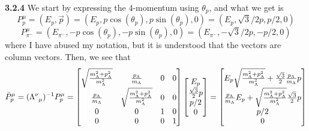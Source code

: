 \documentclass[10pt]{article}
\begin{document}
\textbf{3.2.4} We start by expressing the 4-momentum using $\theta_{p}$, and what we get is
\[ P_{p}^{\mu} = (E_{p}, \vec{p}) = (E_{p}, p\cos(\theta_{p}), p\sin(\theta_{p}), 0) = (E_{p}, \sqrt{3}/2 p, p/2, 0)\]
\[ P_{\pi^{-}}^{\mu} = (E_{\pi^{-}}, -p\cos(\theta_{p}), -p\sin(\theta_{p}), 0) = (E_{\pi^{-}}, -\sqrt{3}/2 p, -p/2, 0) \]
where I have abused my notation, but it is understood that the vectors are column vectors. Then, we see that
\[ \bar{P}_{p}^{\mu} = (\tensor{\Lambda}{^{\nu}_{\mu}})^{-1}P_{p}^{\mu} =
\begin{bmatrix}
  \sqrt{\frac{m_{\Lambda}^{2} + p_{\Lambda}^{2}}{m_{\Lambda}^{2}}} & \frac{p_{\Lambda}}{m_{\Lambda}} & 0  & 0 \\
  \frac{p_{\Lambda}}{m_{\Lambda}} &  \sqrt{\frac{m_{\Lambda}^{2} + p_{\Lambda}^{2}}{m_{\Lambda}^{2}}} & 0 & 0 \\
  0 & 0 & 1 & 0 \\
  0 & 0 & 0 & 1 \\
\end{bmatrix}
\begin{bmatrix}
  E_{p} \\
  \frac{\sqrt{3}}{2} p \\
  p/2 \\
  0 \\
\end{bmatrix}
=
\begin{bmatrix}
  E_{p}\sqrt{\frac{m_{\Lambda}^{2} + p_{\Lambda}^{2}}{m_{\Lambda}^{2}}} + \frac{\sqrt{3}}{2}\frac{p_{\Lambda}}{m_{\Lambda}}p \\
  \frac{p_{\Lambda}}{m_{\Lambda}}E_{p} + \sqrt{\frac{m_{\Lambda}^{2} + p_{\Lambda}^{2}}{m_{\Lambda}^{2}}}\frac{\sqrt{3}}{2} p \\
  p/2 \\
  0 \\
\end{bmatrix}
\]
\end{document}
